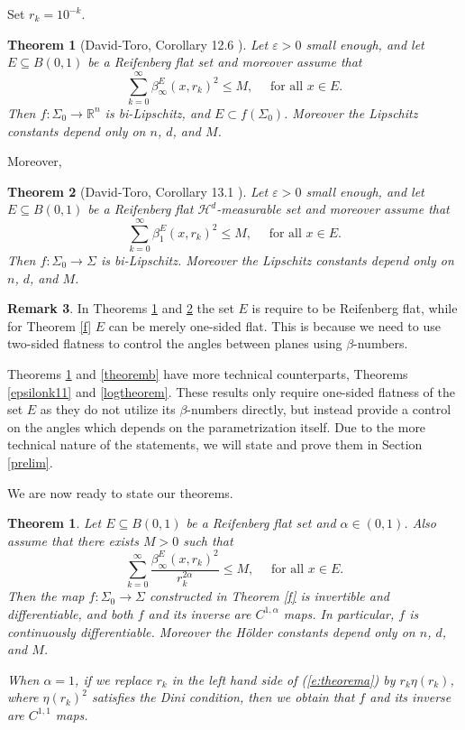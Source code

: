 \documentclass[11pt, twoside, leqno]{article}
\numberwithin{equation}{section}
\theoremstyle{plain}
\newtheorem{thm}{Theorem}[section]
\newtheorem{thmy}{Theorem}
\newenvironment{thmx}{\stepcounter{thm}\begin{thmy}}{\end{thmy}}
\theoremstyle{definition}
\newtheorem{rk}[thm]{Remark}
\newcommand{\R}{\mathbb{R}}
\newcommand{\e}{\varepsilon} %
\begin{document}
Set $r_k=10^{-k}$. 
\begin{thm} [David-Toro, Corollary 12.6 \cite{davidtoro}] \label{dtbinfty}
Let $\e>0$ small enough, and let $E \subseteq B(0,1)$ be a Reifenberg flat set and moreover assume that
\begin{equation} \label{e:dtbinfty}
\sum_{k=0}^{\infty}\beta_{\infty}^E(x,r_k)^2\leq M, \quad \text{ for all $x \in E$}.
\end{equation}
Then $f \colon \Sigma_0 \to \R^n$ is bi-Lipschitz, and $E \subset f(\Sigma_0)$. Moreover the Lipschitz constants depend only on $n$, $d$, and $M$.
\end{thm}
Moreover,
\begin{thm} [David-Toro, Corollary 13.1 \cite{davidtoro}] \label{dtb1}
Let $\e>0$ small enough, and let $E \subseteq B(0,1)$ be a Reifenberg flat $\mathcal{H}^d$-measurable set and moreover assume that
\begin{equation} \label{e:dtb1}
\sum_{k=0}^{\infty}\beta_1^E(x,r_k)^2\leq M, \quad \text{ for all $x \in E$}.
\end{equation}
Then $f \colon \Sigma_0 \to \Sigma$ is bi-Lipschitz. Moreover the Lipschitz constants depend only on $n$, $d$, and $M$. 
\end{thm}

\begin{rk}
In Theorems \ref{dtbinfty} and \ref{dtb1} the set $E$ is require to be Reifenberg flat, while for Theorem \ref{f} $E$ can be merely one-sided flat. This is because we need to use two-sided flatness to control the angles between planes using $\beta$-numbers.

Theorems \ref{theorema} and \ref{theoremb} have more technical counterparts, Theorems \ref{epsilonk11} and \ref{logtheorem}. These results only require one-sided flatness of the set $E$ as they do not utilize its $\beta$-numbers directly, but instead provide a control on the angles which depends on the parametrization itself. Due to the more technical nature of the statements, we will state and prove them in Section \ref{prelim}.
\end{rk}

We are now ready to state our theorems. 

\begin{thmx}\label{theorema}
Let $E \subseteq B(0,1)$ be a Reifenberg flat set and $\alpha \in (0,1)$. Also assume that there exists $M >0$ such that
\begin{equation} \label{e:theorema}
\sum_{k=0}^{\infty}\frac{\beta_{\infty}^E(x,r_k)^2}{r_k^{2\alpha}} \leq M, \quad \text{ for all $x \in E$}.
\end{equation}
Then the map $f \colon \Sigma_0 \to \Sigma$ constructed in Theorem \ref{f} is invertible and differentiable, and both $f$ and its inverse are $C^{1,\alpha}$ maps. In particular, $f$ is continuously differentiable. Moreover the H\"{o}lder constants depend only on $n$, $d$, and $M$.

When $\alpha=1$, if we replace $r_k$ in the left hand side of (\ref{e:theorema}) by $r_k\eta(r_k)$, where $\eta(r_k)^2$ satisfies the Dini condition, then we obtain that $f$ and its inverse are $C^{1,1}$ maps.
\end{thmx}
\end{document}
